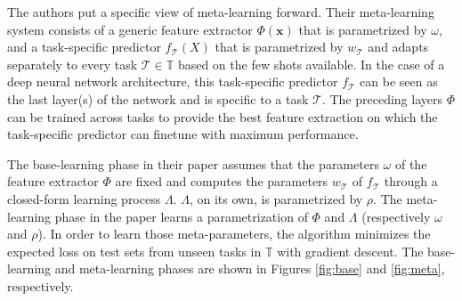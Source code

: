 The authors put a specific view of meta-learning forward. Their meta-learning system consists of a generic feature extractor $\Phi(\bm{x})$ that is parametrized by $\omega$, and a task-specific predictor $f_\mathcal{T}(X)$ that is parametrized by $w_{\mathcal{T}}$ and adapts separately to every task $\mathcal{T} \in \mathbb{T}$ based on the few shots available. In the case of a deep neural network architecture, this task-specific predictor $f_\mathcal{T}$ can be seen as the last layer(s) of the network and is specific to a task $\mathcal{T}$. The preceding layers $\Phi$ can be trained across tasks to provide the best feature extraction on which the task-specific predictor can finetune with maximum performance.

The base-learning phase in their paper assumes that the parameters $\omega$ of the feature extractor $\Phi$ are fixed and computes the parameters $w_\mathcal{T}$ of $f_\mathcal{T}$ through a closed-form learning process $\Lambda$. $\Lambda$, on its own, is parametrized by $\rho$. The meta-learning phase in the paper learns a parametrization of $\Phi$ and $\Lambda$ (respectively $\omega$ and $\rho$). In order to learn those meta-parameters, the algorithm minimizes the expected loss on test sets from unseen tasks in $\mathbb{T}$ with gradient descent. The base-learning and meta-learning phases are shown in Figures \ref{fig:base} and \ref{fig:meta}, respectively.

